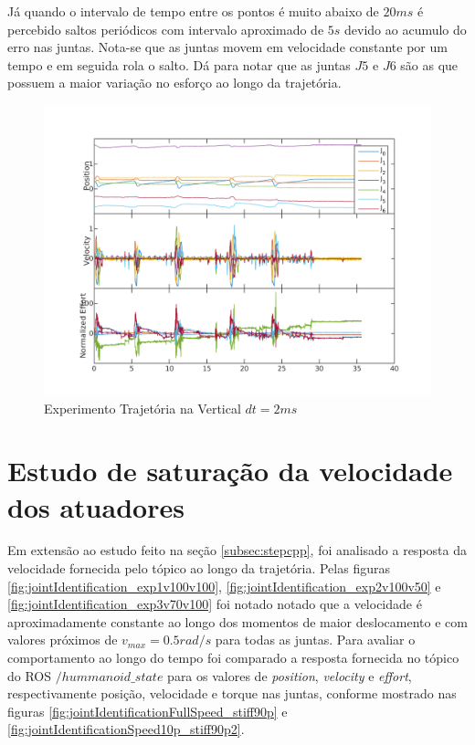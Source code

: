 Já quando o intervalo de tempo entre os pontos é muito abaixo de $20ms$ é percebido saltos periódicos com intervalo aproximado de $5s$ devido ao acumulo do erro nas juntas. Nota-se que as juntas movem em velocidade constante por um tempo e em seguida rola o salto. Dá para notar que as juntas $J5$ e $J6$ são as que possuem a maior variação no esforço ao longo da trajetória.

\vspace{1cm}

\begin{figure}[H]
    \centering
    \includegraphics[width=0.6\linewidth,trim={2cm 1cm 2cm 2cm}]{tex/figs/moveUp3stateEvalv70s50.png}
    \caption{Experimento Trajetória na Vertical $dt=2ms$ }
    \label{fig:moveUp3}
\end{figure}


\section{Estudo de saturação da velocidade dos atuadores}

Em extensão ao estudo feito na seção \ref{subsec:stepcpp}, foi analisado a resposta da velocidade fornecida pelo tópico ao longo da trajetória. Pelas figuras \ref{fig:jointIdentification_exp1v100v100}, \ref{fig:jointIdentification_exp2v100v50} e \ref{fig:jointIdentification_exp3v70v100} foi notado notado que a velocidade é aproximadamente constante ao longo dos momentos de maior deslocamento e com valores próximos de $v_{max} = 0.5 rad/s$ para todas as juntas. Para avaliar o comportamento ao longo do tempo foi comparado a resposta fornecida no tópico do ROS $/hummanoid\_state$ para os valores de \textit{position}, \textit{velocity} e \textit{effort}, respectivamente posição, velocidade e torque nas juntas, conforme mostrado nas figuras \ref{fig:jointIdentificationFullSpeed_stiff90p} e \ref{fig:jointIdentificationSpeed10p_stiff90p2}.

